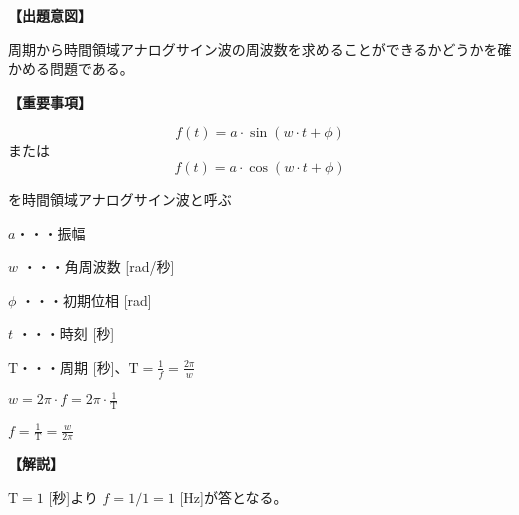 \noindent \textbf{【出題意図】}

\noindent 周期から時間領域アナログサイン波の周波数を求めることができるかどうかを確かめる問題である。

\vspace{1em}
\noindent \textbf{【重要事項】}

\[
f(t) = a \cdot \sin( w \cdot t + \phi )
\]
%
\noindent または
%
\[
f(t) = a \cdot \cos( w \cdot t + \phi )
\]

\medskip
\noindent を時間領域アナログサイン波と呼ぶ

\bigskip
\noindent $a$・・・振幅

\bigskip
\noindent $w$ ・・・角周波数 [rad/秒]

\bigskip
\noindent $\phi$ ・・・初期位相 [rad]

\bigskip
\noindent $t$ ・・・時刻 [秒]

\bigskip
$\textrm{T}$・・・周期 [秒]、$\textrm{T} = \frac{1}{f} = \frac{2\pi}{w}$

\bigskip
$w = 2\pi \cdot f = 2 \pi \cdot \frac{1}{\textrm{T}}$

\bigskip
$f = \frac{1}{\textrm{T}} = \frac{w}{2\pi}$

\vspace{1em}
\noindent \textbf{【解説】}

\noindent $\textrm{T} = 1$ [秒]より $f = 1 / 1 = 1$ [Hz]が答となる。
